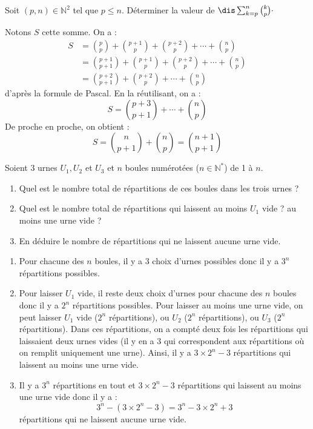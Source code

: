 \documentclass[a4paper,10pt]{report}
\begin{document}
\begin{Exa} Soit $(p, n) \in \mathbb{N}^2$ tel que $p \leq n$. Déterminer la valeur de $\dis\sum_{k=p}^n{k\choose p} \cdot$

\end{Exa}

\corr Notons $S$ cette somme. On a :
\begin{align*}
S & = \binom{p}{p} + \binom{p+1}{p} + \binom{p+2}{p} + \cdots + \binom{n}{p} \\
& = \binom{p+1}{p+1} + \binom{p+1}{p} + \binom{p+2}{p} + \cdots + \binom{n}{p} \\
& =  \binom{p+2}{p+1} + \binom{p+2}{p} + \cdots + \binom{n}{p} 
\end{align*}
d'après la formule de Pascal. En la réutilisant, on a :
$$ S = \binom{p+3}{p+1} +  \cdots + \binom{n}{p} $$
De proche en proche, on obtient :
$$ S = \binom{n}{p+1}  + \binom{n}{p} = \binom{n+1}{p+1} $$

\begin{Exa}Soient $3$ urnes $U_1,U_2$ et $U_3$ et $n$ boules numérotées ($n \in \mathbb{N}^*$) de 1 à $n$.
\begin{enumerate}
\item Quel est le nombre total de répartitions de ces boules dans les trois urnes ?
\item Quel est le nombre total de répartitions qui laissent au moins $U_1$ vide ? au moins une urne vide ?
\item En déduire le nombre de répartitions qui ne laissent aucune urne vide.
\end{enumerate}
\end{Exa}

\corr 

\begin{enumerate}
\item Pour chacune des $n$ boules, il y a $3$ choix d'urnes possibles donc il y a $3^n$ répartitions possibles.
\item Pour laisser $U_1$ vide, il reste deux choix d'urnes pour chacune des $n$ boules donc il y a $2^n$ répartitions possibles. Pour laisser au moins une urne vide, on peut laisser $U_1$ vide ($2^n$ répartitions), ou $U_2$  ($2^n$ répartitions), ou $U_3$  ($2^n$ répartitions). Dans ces répartitions, on a compté deux fois les répartitions qui laissaient deux urnes vides (il y en a $3$ qui correspondent aux répartitions où on remplit uniquement une urne). Ainsi, il y a $3 \times 2^n - 3$ répartitions qui laissent au moins une urne vide.
\item Il y a $3^n$ répartitions en tout et $3 \times 2^n - 3$ répartitions qui laissent au moins une urne vide donc il y a :
$$ 3^n - (3 \times 2^n - 3) = 3^n - 3 \times 2^n + 3$$
répartitions qui ne laissent aucune urne vide.
\end{enumerate}
\end{document}
